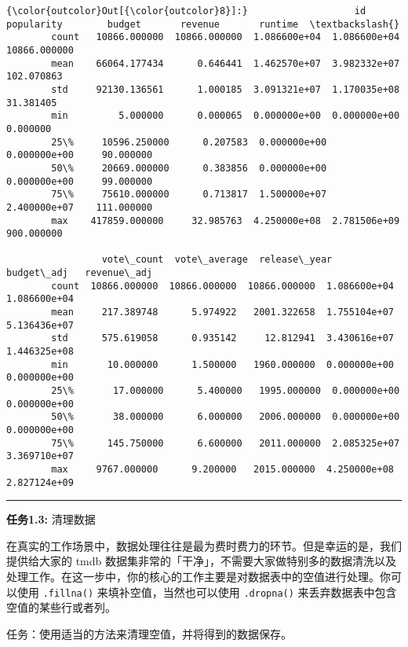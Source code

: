 \documentclass[11pt]{article}
\begin{document}
\begin{Verbatim}[commandchars=\\\{\}]
{\color{outcolor}Out[{\color{outcolor}8}]:}                   id    popularity        budget       revenue       runtime  \textbackslash{}
        count   10866.000000  10866.000000  1.086600e+04  1.086600e+04  10866.000000   
        mean    66064.177434      0.646441  1.462570e+07  3.982332e+07    102.070863   
        std     92130.136561      1.000185  3.091321e+07  1.170035e+08     31.381405   
        min         5.000000      0.000065  0.000000e+00  0.000000e+00      0.000000   
        25\%     10596.250000      0.207583  0.000000e+00  0.000000e+00     90.000000   
        50\%     20669.000000      0.383856  0.000000e+00  0.000000e+00     99.000000   
        75\%     75610.000000      0.713817  1.500000e+07  2.400000e+07    111.000000   
        max    417859.000000     32.985763  4.250000e+08  2.781506e+09    900.000000   
        
                 vote\_count  vote\_average  release\_year    budget\_adj   revenue\_adj  
        count  10866.000000  10866.000000  10866.000000  1.086600e+04  1.086600e+04  
        mean     217.389748      5.974922   2001.322658  1.755104e+07  5.136436e+07  
        std      575.619058      0.935142     12.812941  3.430616e+07  1.446325e+08  
        min       10.000000      1.500000   1960.000000  0.000000e+00  0.000000e+00  
        25\%       17.000000      5.400000   1995.000000  0.000000e+00  0.000000e+00  
        50\%       38.000000      6.000000   2006.000000  0.000000e+00  0.000000e+00  
        75\%      145.750000      6.600000   2011.000000  2.085325e+07  3.369710e+07  
        max     9767.000000      9.200000   2015.000000  4.250000e+08  2.827124e+09  
\end{Verbatim}
            
    \begin{center}\rule{0.5\linewidth}{\linethickness}\end{center}

\textbf{任务1.3: } 清理数据

在真实的工作场景中，数据处理往往是最为费时费力的环节。但是幸运的是，我们提供给大家的
tmdb
数据集非常的「干净」，不需要大家做特别多的数据清洗以及处理工作。在这一步中，你的核心的工作主要是对数据表中的空值进行处理。你可以使用
\texttt{.fillna()} 来填补空值，当然也可以使用 \texttt{.dropna()}
来丢弃数据表中包含空值的某些行或者列。

任务：使用适当的方法来清理空值，并将得到的数据保存。
\end{document}
